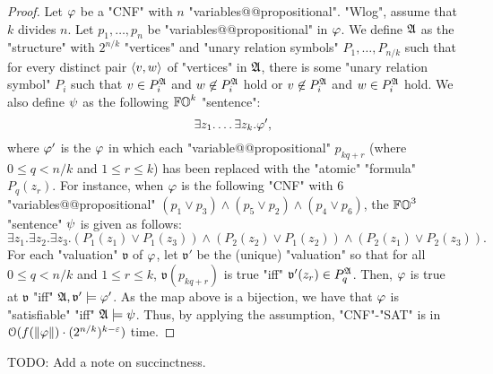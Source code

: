 \begin{proof}
    Let $\fml$ be a "CNF" with $n$ "variables@@propositional".
    "Wlog", assume that $k$ divides $n$.
    Let $p_1, \dots, p_{n}$ be "variables@@propositional" in $\fml$.
    We define $\struc$ as the "structure" with $2^{n/k}$ "vertices" and "unary relation symbols" $P_1, \dots, P_{n/k}$ such that 
    for every distinct pair $\langle v, w\rangle$ of "vertices" in $\struc$,
    there is some "unary relation symbol" $P_i$ such that
    $v \in P_i^{\struc}$ and $w \not\in P_i^{\struc}$ hold or 
    $v \not\in P_i^{\struc}$ and $w \in P_i^{\struc}$ hold.
    We also define $\fml[2]$ as the following $\mathbb{FO}^{k}$ "sentence":
    \[\exists z_1. \dots \exists z_k. \fml[1]',\]
    where $\fml[1]'$ is the $\fml$ in which
    each "variable@@propositional" $p_{kq+r}$ (where $0 \le q < n/k$ and $1 \le r \le k$) has been replaced with the "atomic" "formula" $P_q(z_r)$.
    For instance, when $\fml$ is the following "CNF" with $6$ "variables@@propositional" $(p_1 \lor p_3) \land (p_5 \lor p_2) \land (p_4 \lor p_6)$,
    the $\mathbb{FO}^{3}$ "sentence" $\fml[2]$ is given as follows:
    \[\exists z_1.\exists z_2.\exists z_3. (P_1(z_1) \lor P_1(z_3)) \land (P_2(z_2) \lor P_1(z_2)) \land (P_2(z_1) \lor P_2(z_3)).\]
    For each "valuation" $\mathfrak{v}$ of $\fml$, 
    let $\mathfrak{v}'$ be the (unique) "valuation" so that for all $0 \le q < n/k$ and $1 \le r \le k$,
    $\mathfrak{v}(p_{kq+r})$ is true "iff" $\mathfrak{v}'(z_r) \in P_q^{\struc}$.
    Then, $\fml$ is true at $\mathfrak{v}$ "iff" $\struc, \mathfrak{v}' \models \fml[1]'$.
    As the map above is a bijection, we have that $\fml$ is "satisfiable" "iff" $\struc \models \fml[2]$.
    Thus, by applying the assumption,
    "CNF"-"SAT" is in $\mathcal{O}(f(\len{\fml}) \cdot (2^{n/k})^{k-\eps})$ time.
\end{proof}

\begin{yoshiki}
    TODO: Add a note on succinctness.
\end{yoshiki}

